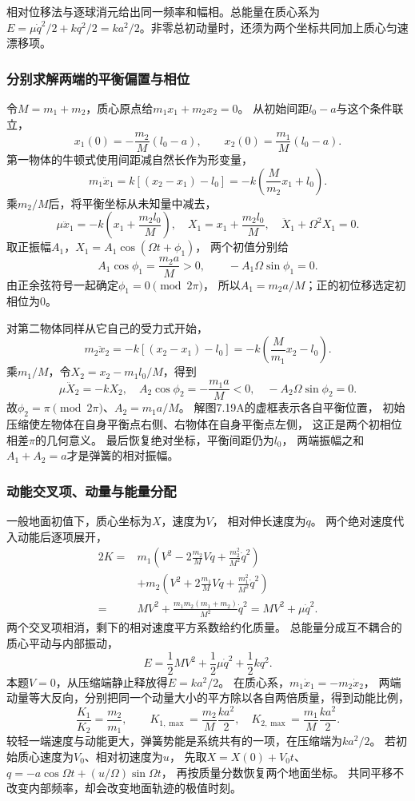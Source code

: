 \documentclass[UTF8,fontset=fandol,a4paper,11pt]{ctexart}
\begin{document}
相对位移法与逐球消元给出同一频率和幅相。总能量在质心系为 $E=\mu\dot q^2/2+kq^2/2=ka^2/2$。非零总初动量时，还须为两个坐标共同加上质心匀速漂移项。
\subsubsection*{分别求解两端的平衡偏置与相位}
令$M=m_1+m_2$，质心原点给$m_1x_1+m_2x_2=0$。
从初始间距$l_0-a$与这个条件联立，
\[
x_1(0)=-\frac{m_2}{M}(l_0-a),\qquad
x_2(0)=\frac{m_1}{M}(l_0-a).
\]
第一物体的牛顿式使用间距减自然长作为形变量，
\[
m_1\ddot x_1=k[(x_2-x_1)-l_0]
=-k\left(\frac{M}{m_2}x_1+l_0\right).
\]
乘$m_2/M$后，将平衡坐标从未知量中减去，
\[
\mu\ddot x_1=-k\left(x_1+\frac{m_2l_0}{M}\right),
\quad X_1=x_1+\frac{m_2l_0}{M},\quad
\ddot X_1+\Omega^2X_1=0.
\]
取正振幅$A_1$，$X_1=A_1\cos(\Omega t+\phi_1)$，
两个初值分别给
\[
A_1\cos\phi_1=\frac{m_2a}{M}>0,\qquad
-A_1\Omega\sin\phi_1=0.
\]
由正余弦符号一起确定$\phi_1=0\pmod{2\pi}$，
所以$A_1=m_2a/M$；正的初位移选定初相位为0。

对第二物体同样从它自己的受力式开始，
\[
m_2\ddot x_2=-k[(x_2-x_1)-l_0]
=-k\left(\frac{M}{m_1}x_2-l_0\right).
\]
乘$m_1/M$，令$X_2=x_2-m_1l_0/M$，得到
\[
\mu\ddot X_2=-kX_2,\quad
A_2\cos\phi_2=-\frac{m_1a}{M}<0,\quad
-A_2\Omega\sin\phi_2=0.
\]
故$\phi_2=\pi\pmod{2\pi}$、$A_2=m_1a/M$。
解图7.19A的虚框表示各自平衡位置，
初始压缩使左物体在自身平衡点右侧、右物体在自身平衡点左侧，
这正是两个初相位相差$\pi$的几何意义。
最后恢复绝对坐标，平衡间距仍为$l_0$，
两端振幅之和$A_1+A_2=a$才是弹簧的相对振幅。

\subsubsection*{动能交叉项、动量与能量分配}
一般地面初值下，质心坐标为$X$，速度为$V$，
相对伸长速度为$\dot q$。
两个绝对速度代入动能后逐项展开，
\[
\begin{aligned}
2K={}&m_1\left(V^2-2\frac{m_2}{M}V\dot q+\frac{m_2^2}{M^2}\dot q^2\right)\\
&+m_2\left(V^2+2\frac{m_1}{M}V\dot q+\frac{m_1^2}{M^2}\dot q^2\right)\\
={}&MV^2+\frac{m_1m_2(m_1+m_2)}{M^2}\dot q^2
=MV^2+\mu\dot q^2.
\end{aligned}
\]
两个交叉项相消，剩下的相对速度平方系数给约化质量。
总能量分成互不耦合的质心平动与内部振动，
\[
E=\frac12MV^2+\frac12\mu\dot q^2+\frac12kq^2.
\]
本题$V=0$，从压缩端静止释放得$E=ka^2/2$。
在质心系，$m_1\dot x_1=-m_2\dot x_2$，
两端动量等大反向，分别把同一个动量大小的平方除以各自两倍质量，得到动能比例，
\[
\frac{K_1}{K_2}=\frac{m_2}{m_1},\qquad
K_{1,\max}=\frac{m_2}{M}\frac{ka^2}{2},\quad
K_{2,\max}=\frac{m_1}{M}\frac{ka^2}{2}.
\]
较轻一端速度与动能更大，弹簧势能是系统共有的一项，在压缩端为$ka^2/2$。
若初始质心速度为$V_0$、相对初速度为$u$，
先取$X=X(0)+V_0t$、
$q=-a\cos\Omega t+(u/\Omega)\sin\Omega t$，
再按质量分数恢复两个地面坐标。
共同平移不改变内部频率，却会改变地面轨迹的极值时刻。
\end{document}
